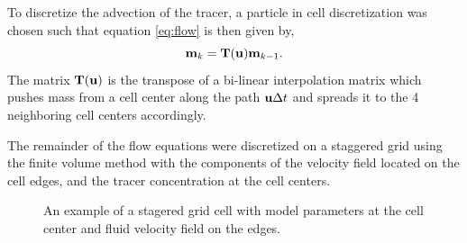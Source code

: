 \documentclass[11pt]{article}
\newcommand{\bfT}	{{\bf{T}}}
\newcommand{\bfm}	{{\bf{m}}}
\newcommand{\bfu}	{{\bf{u}}}
\begin{document}
To discretize the advection of the tracer, a particle in cell discretization was chosen such that equation \eqref{eq:flow} is then given by,
\begin{equation*}
\bfm _k= \bfT(\bfu)\bfm_{k-1}. 
\end{equation*}
The matrix $\bfT(\bfu)$ is the transpose of a bi-linear interpolation matrix which pushes mass from a cell center along the  path $\bfu \Delta t$ and spreads it to the 4 neighboring cell centers accordingly. 

The remainder of the flow equations were discretized on a staggered grid using the finite volume method with the components of the velocity field located on the cell edges, and the tracer concentration at the cell centers. 


\begin{figure}[!h]
\label{fig:cell}
\begin{center}
\caption{An example of a stagered grid cell with model parameters at the cell center and fluid velocity field on the edges. \label{fig:stag}}
\end{center}
\end{figure}
\end{document}

